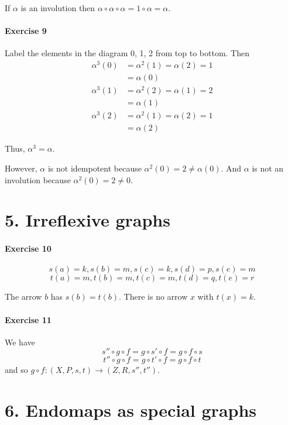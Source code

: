 \documentclass{report}
\begin{document}
    If $\alpha$ is an involution then $\alpha \circ \alpha \circ \alpha = 1 \circ \alpha = \alpha$.

    \paragraph{Exercise 9}
    Label the elements in the diagram 0, 1, 2 from top to bottom. Then
    \begin{align*}
        \alpha^3(0) & = \alpha^2(1) = \alpha(2) = 1 \\
        & = \alpha(0) \\
        \alpha^3(1) & = \alpha^2(2) = \alpha(1) = 2 \\
        & = \alpha(1) \\
        \alpha^3(2) & = \alpha^2(1) = \alpha(2) = 1 \\
        & = \alpha(2)
    \end{align*}

    Thus, $\alpha^3 = \alpha$.

    However, $\alpha$ is not idempotent because $\alpha^2(0) = 2 \neq \alpha(0)$. And $\alpha$ is not an involution
    because $\alpha^2(0) = 2 \neq 0$.

    \section{5. Irreflexive graphs}

    \paragraph{Exercise 10}
    \[ s(a) = k, s(b) = m, s(c) = k, s(d) = p, s(e) = m \]
    \[ t(a) = m, t(b) = m, t(c) = m, t(d) = q, t(e) = r \]

    The arrow $b$ has $s(b) = t(b)$. There is no arrow $x$ with $t(x) = k$.

    \paragraph{Exercise 11}
    We have
    \[ s'' \circ g \circ f = g \circ s' \circ f = g \circ f \circ s \]
    \[ t'' \circ g \circ f = g \circ t' \circ f = g \circ f \circ t \]
    and so $g \circ f : (X,P,s,t) \rightarrow (Z,R,s'',t'')$.

    \section{6. Endomaps as special graphs}
    
\end{document}
